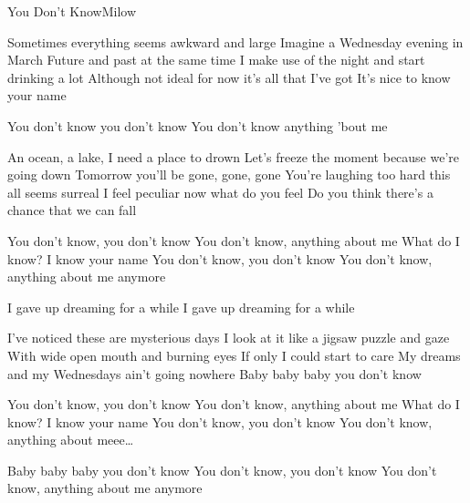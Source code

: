 \begin{Song}{You Don't Know}{Milow}

\begin{multicols}{2}
\begin{Verse}
Sometimes everything seems awkward and large
Imagine a Wednesday evening in March
Future and past at the same time
I make use of the night and start drinking a lot
Although not ideal for now it's all that I've got
It's nice to know your name
\end{Verse}
\espaceInterStrophe

\begin{Chorus}
You don't know you don't know
You don't know anything 'bout me
\end{Chorus}
\espaceInterStrophe

\begin{Verse}
An ocean, a lake, I need a place to drown
Let's freeze the moment because we're going down
Tomorrow you'll be gone, gone, gone
You're laughing too hard this all seems surreal
I feel peculiar now what do you feel
Do you think there's a chance that we can fall
\end{Verse}
\espaceInterStrophe

\begin{Chorus}
You don't know, you don't know
You don't know, anything about me
What do I know? I know your name
You don't know, you don't know
You don't know, anything about me anymore
\end{Chorus}
\columnbreak

\begin{Bridge}
I gave up dreaming for a while
I gave up dreaming for a while
\end{Bridge}
\espaceInterStrophe

\begin{Verse}
I've noticed these are mysterious days
I look at it like a jigsaw puzzle and gaze
With wide open mouth and burning eyes
If only I could start to care
My dreams and my Wednesdays ain't going nowhere
Baby baby baby you don't know
\end{Verse}
\espaceInterStrophe

\begin{Chorus}
You don't know, you don't know
You don't know, anything about me
What do I know? I know your name
You don't know, you don't know
You don't know, anything about meee\dots
\espaceInterStrophe

Baby baby baby you don't know
You don't know, you don't know
You don't know, anything about me anymore
\end{Chorus}


\end{multicols}
\end{Song}

